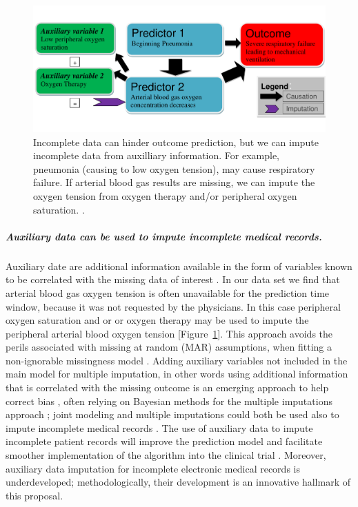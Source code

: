 \documentclass[11pt,notitlepage]{article}
\begin{document}
\begin{figure} 
 \vspace{-30pt}
 \includegraphics[scale=0.4]{Figures/Bayesian_imputation.pdf}
    \vspace{-20pt}
  \caption{\footnotesize Incomplete data can hinder outcome prediction, but we can impute incomplete data from auxilliary information. For example, pneumonia (causing to low oxygen tension), may cause respiratory failure. If arterial blood gas results are missing, we can impute the oxygen tension from oxygen therapy and/or peripheral oxygen saturation. \cite{Hall_25389642}.}
   \vspace{-10pt}
    \label{fig:Imputation_fig}
\end{figure}

\subparagraph*{Auxiliary data can be used to impute incomplete medical records.}
Auxiliary date are additional information available in the form of variables known to be correlated with the missing data of interest \cite{Daniels24571539}. In our data set we find that arterial blood gas oxygen tension is often unavailable for the prediction time window, because it was not requested by the physicians. In this case peripheral oxygen saturation and or or oxygen therapy may be used to impute the peripheral arterial blood oxygen tension [Figure~\ref{fig:Imputation_fig}]. This approach avoids the perils associated with missing at random (MAR) assumptions, when fitting a non-ignorable missingness model \cite{Wang_20029935}. Adding auxiliary variables not included in the main model for multiple imputation, in other words using additional information that is correlated with the missing outcome is an emerging approach to help correct bias \cite{Meng_1994, Collins_11778676, Rubin_1996}, often relying on Bayesian methods for the multiple imputations approach \cite{Daniels_2008, Schafer_1997}; joint modeling and multiple imputations could both be used also to impute incomplete medical records \cite{Fitzmaurice_2008}. The use of auxiliary data to impute incomplete patient records will improve the prediction model and facilitate smoother implementation of the algorithm into the clinical trial \cite{Hall_25389642}. Moreover, auxiliary data imputation for incomplete electronic medical records is underdeveloped; methodologically, their development is an innovative hallmark of this proposal.
\end{document}
